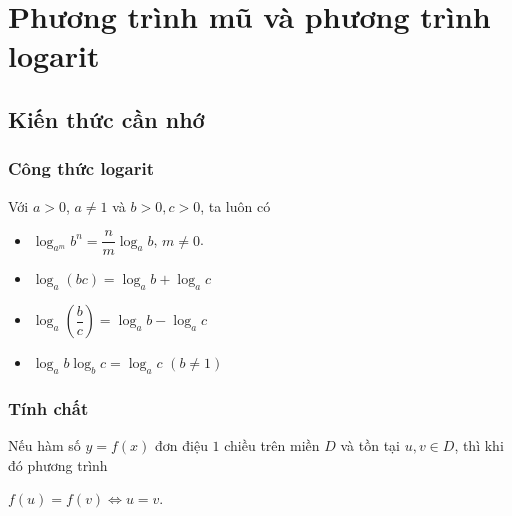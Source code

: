 \section{Phương trình mũ và phương trình logarit}
\subsection{Kiến thức cần nhớ}
\begin{khung}
	\subsubsection{Công thức logarit} 
	Với $a>0$, $a \neq 1$ và $b>0, c>0$, ta luôn có
	\begin{multicols}{2}
		\begin{itemize}
			\item $\log_{a^m}b^n=\dfrac{n}{m}\log_ab$, $m \neq 0$.
			\item $\log_a(bc)=\log_ab+\log_ac$
			\item $\log_a\left(\dfrac{b}{c}\right)=\log_ab-\log_ac$
			\item $\log_ab\log_bc=\log_ac$ \quad $( b \neq 1)$
		\end{itemize}
	\end{multicols}
	\subsubsection{Tính chất}
	Nếu hàm số $y=f(x)$ đơn điệu $1$ chiều trên miền $D$ và tồn tại $u,v\in D$, thì khi đó phương trình
	\begin{center}
		$f(u)=f(v)\Leftrightarrow u=v$.
	\end{center}
\end{khung}
